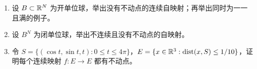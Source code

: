 \begin{enumerate}
\begin{enumerate}[label=(\alph*)]
\item 以 $|\mathcal B|$ 表示各多边形的并，证明 $\chi(\mathcal B)=\text{面数}-\text{边数}+\text{顶点数}$。［提示：从每个面的内点作星形剖分，得到单纯复形。］
\item 证明底空间同胚于 $S^2$ 的组合正则族只有五种。［提示：几何条件给出 $k\geq3$、$\ell\geq3$。］
\item 底空间同胚于环面的组合正则族有许多，但 $k,\ell$ 的可能值有限，求这些可能值。
\end{enumerate}
\item 设 $B\subset\mathbb{R}^N$ 为开单位球，举出没有不动点的连续自映射；再举出同时为一一且满的例子。
\item 设 $B^N$ 为闭单位球，举出不连续且没有不动点的自映射。
\item 令 $S=\{(\cos t,\sin t,t):0\leq t\leq4\pi\}$，$E=\{x\in\mathbb{R}^3:\operatorname{dist}(x,S)\leq1/10\}$，证明每个连续映射 $f:E\to E$ 都有不动点。
\end{enumerate}
